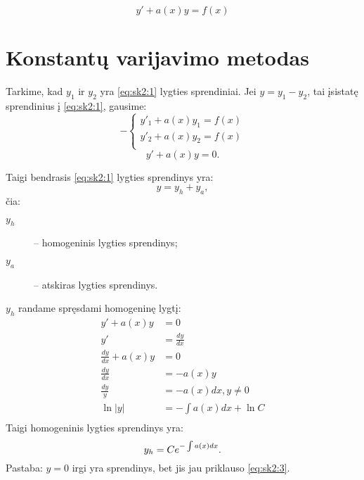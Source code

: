
\begin{equation}
  y' + a(x) y = f(x)
  \label{eq:sk2:1}
\end{equation}

\section{Konstantų varijavimo metodas}

Tarkime, kad $y_{1}$ ir $y_{2}$ yra \ref{eq:sk2:1} lygties sprendiniai.
Jei $y = y_{1} - y_{2}$, tai įsistatę sprendinius į \ref{eq:sk2:1},
gausime:
\begin{equation*}
  -\left\{%
  \begin{aligned}
    y'_{1} + a(x) y_{1} = f(x) \\
    y'_{2} + a(x) y_{2} = f(x) \\
  \end{aligned}%
  \right.
\end{equation*}
\begin{equation*}
  y' + a(x) y = 0.
\end{equation*}

Taigi bendrasis \ref{eq:sk2:1} lygties sprendinys yra:
\begin{equation}
  y = y_{h} + y_{a},
  \label{eq:sk2:2}
\end{equation}
čia:
\begin{description}
  \item[$y_{h}$] – homogeninis lygties sprendinys;
  \item[$y_{a}$] – atskiras lygties sprendinys.
\end{description}

$y_{h}$ randame spręsdami homogeninę lygtį:
\begin{align*}
  y' + a(x) y &= 0 \\
  y' &= \frac{dy}{dx} \\
  \frac{dy}{dx} + a(x) y &= 0 \\
  \frac{dy}{dx} &= - a(x) y \\
  \frac{dy}{y} &= - a(x) dx, y \neq 0 \\
  \ln |y| &= - \int a(x) dx + \ln C \\
\end{align*}
Taigi homogeninis lygties sprendinys yra:
\begin{equation}
  y_{h} = C e^{-\int a(x) dx}. \\
  \label{eq:sk2:3}
\end{equation}
Pastaba: $y=0$ irgi yra sprendinys, bet jis jau priklauso \ref{eq:sk2:3}.

